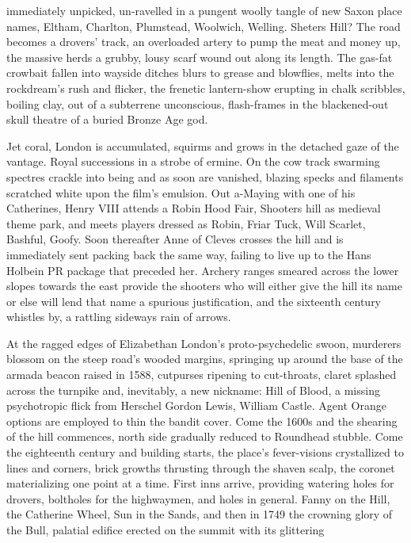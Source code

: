 \documentclass[
]{article}
\begin{document}
immediately unpicked, un-ravelled in a pungent woolly tangle of new
Saxon place names, Eltham, Charlton, Plumstead, Woolwich, Welling.
Sheters Hill? The road becomes a drovers' track, an overloaded artery to
pump the meat and money up, the massive herds a grubby, lousy scarf
wound out along its length. The gas-fat crowbait fallen into wayside
ditches blurs to grease and blowflies, melts into the rockdream's rush
and flicker, the frenetic lantern-show erupting in chalk scribbles,
boiling clay, out of a subterrene unconscious, flash-frames in the
blackened-out skull theatre of a buried Bronze Age god. \par
Jet coral, London is accumulated, squirms and grows in the
detached gaze of the vantage. Royal successions in a strobe of ermine.
On the cow track swarming spectres crackle into being and as soon are
vanished, blazing specks and filaments scratched white upon the film's
emulsion. Out a-Maying with one of his Catherines, Henry VIII attends a
Robin Hood Fair, Shooters hill as medieval theme park, and meets players
dressed as Robin, Friar Tuck, Will Scarlet, Bashful, Goofy. Soon
thereafter Anne of Cleves crosses the hill and is immediately sent
packing back the same way, failing to live up to the Hans Holbein PR
package that preceded her. Archery ranges smeared across the lower
slopes towards the east provide the shooters who will either give the
hill its name or else will lend that name a spurious justification, and
the sixteenth century whistles by, a rattling sideways rain of arrows. \par
At the ragged edges of Elizabethan London's proto-psychedelic
swoon, murderers blossom on the steep road's wooded margins, springing
up around the base of the armada beacon raised in 1588, cutpurses
ripening to cut-throats, claret splashed across the turnpike and,
inevitably, a new nickname: Hill of Blood, a missing psychotropic flick
from Herschel Gordon Lewis, William Castle. Agent Orange options are
employed to thin the bandit cover. Come the 1600s and the shearing of
the hill commences, north side gradually reduced to Roundhead stubble.
Come the eighteenth century and building starts, the place's
fever-visions crystallized to lines and corners, brick growths thrusting
through the shaven scalp, the coronet materializing one point at a time.
First inns arrive, providing watering holes for drovers, boltholes for
the highwaymen, and holes in general. Fanny on the Hill, the Catherine
Wheel, Sun in the Sands, and then in 1749 the crowning glory of the
Bull, palatial edifice erected on the summit with its glittering
\end{document}
